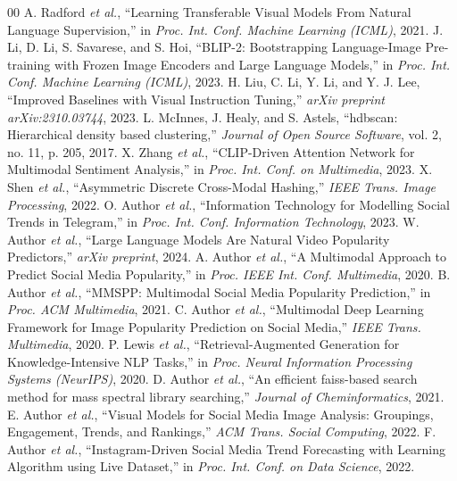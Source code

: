 \documentclass[conference]{IEEEtran}
\begin{document}
\begin{thebibliography}{00}
 A. Radford \emph{et al.}, ``Learning Transferable Visual Models From Natural Language Supervision,'' in \emph{Proc. Int. Conf. Machine Learning (ICML)}, 2021.
 J. Li, D. Li, S. Savarese, and S. Hoi, ``BLIP-2: Bootstrapping Language-Image Pre-training with Frozen Image Encoders and Large Language Models,'' in \emph{Proc. Int. Conf. Machine Learning (ICML)}, 2023.
 H. Liu, C. Li, Y. Li, and Y. J. Lee, ``Improved Baselines with Visual Instruction Tuning,'' \emph{arXiv preprint arXiv:2310.03744}, 2023.
 L. McInnes, J. Healy, and S. Astels, ``hdbscan: Hierarchical density based clustering,'' \emph{Journal of Open Source Software}, vol. 2, no. 11, p. 205, 2017.
 X. Zhang \emph{et al.}, ``CLIP-Driven Attention Network for Multimodal Sentiment Analysis,'' in \emph{Proc. Int. Conf. on Multimedia}, 2023.
 X. Shen \emph{et al.}, ``Asymmetric Discrete Cross-Modal Hashing,'' \emph{IEEE Trans. Image Processing}, 2022.
 O. Author \emph{et al.}, ``Information Technology for Modelling Social Trends in Telegram,'' in \emph{Proc. Int. Conf. Information Technology}, 2023.
 W. Author \emph{et al.}, ``Large Language Models Are Natural Video Popularity Predictors,'' \emph{arXiv preprint}, 2024.
 A. Author \emph{et al.}, ``A Multimodal Approach to Predict Social Media Popularity,'' in \emph{Proc. IEEE Int. Conf. Multimedia}, 2020.
 B. Author \emph{et al.}, ``MMSPP: Multimodal Social Media Popularity Prediction,'' in \emph{Proc. ACM Multimedia}, 2021.
 C. Author \emph{et al.}, ``Multimodal Deep Learning Framework for Image Popularity Prediction on Social Media,'' \emph{IEEE Trans. Multimedia}, 2020.
 P. Lewis \emph{et al.}, ``Retrieval-Augmented Generation for Knowledge-Intensive NLP Tasks,'' in \emph{Proc. Neural Information Processing Systems (NeurIPS)}, 2020.
 D. Author \emph{et al.}, ``An efficient faiss-based search method for mass spectral library searching,'' \emph{Journal of Cheminformatics}, 2021.
 E. Author \emph{et al.}, ``Visual Models for Social Media Image Analysis: Groupings, Engagement, Trends, and Rankings,'' \emph{ACM Trans. Social Computing}, 2022.
 F. Author \emph{et al.}, ``Instagram-Driven Social Media Trend Forecasting with Learning Algorithm using Live Dataset,'' in \emph{Proc. Int. Conf. on Data Science}, 2022.
\end{thebibliography}
\end{document}
